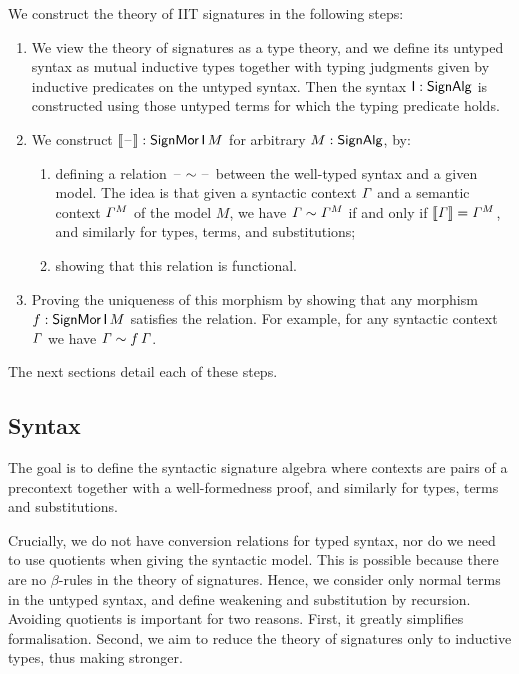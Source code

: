 


We construct the theory of IIT signatures in the following steps:
\begin{enumerate}
\item We view the theory of signatures as a type theory, and we define
  its untyped syntax as mutual inductive types together with typing
  judgments given by inductive predicates on the untyped syntax. Then
  the syntax $\mathsf{I} : \mathsf{SignAlg}$ is constructed using those untyped terms
  for which the typing predicate holds.
\item We construct $\llbracket\mathord{\hspace{1pt}\text{--}\hspace{1pt}}\rrbracket:\mathsf{SignMor}\,\mathsf{I}\,M$ for arbitrary
  $M : \mathsf{SignAlg}$, by:
  \begin{enumerate}
  \item defining a relation $\mathord{\hspace{1pt}\text{--}\hspace{1pt}} \sim \mathord{\hspace{1pt}\text{--}\hspace{1pt}}$ between the well-typed syntax
    and a given model. The idea is that given a syntactic context $\mathit{\Gamma}$ and a
    semantic context ${\mathit{\Gamma}}^M$ of the model $M$, we have
    $\mathit{\Gamma} \sim {\mathit{\Gamma}}^M$ if and only if $\llbracket\mathit{\Gamma}\rrbracket
    = {\mathit{\Gamma}}^M$, and similarly for types, terms, and substitutions;
  \item showing that this relation is functional.
    \end{enumerate}
  \item Proving the uniqueness of this morphism by showing that any morphism
    $f:\mathsf{SignMor}\,\mathsf{I}\,M$ satisfies the relation. For example, for any syntactic context
    $\mathit{\Gamma}$ we have $\mathit{\Gamma}\sim f\,\mathit{\Gamma}$.
\end{enumerate}
The next sections detail each of these steps.

\subsection{Syntax}

The goal is to define the syntactic signature algebra where contexts
are pairs of a precontext together with a well-formedness proof, and
similarly for types, terms and substitutions.

Crucially, we do not have conversion relations for typed syntax, nor
do we need to use quotients when giving the syntactic model. This is
possible because there are no $\beta$-rules in the theory of
signatures. Hence, we consider only normal terms in the untyped
syntax, and define weakening and substitution by recursion.  Avoiding
quotients is important for two reasons. First, it greatly simplifies
formalisation. Second, we aim to reduce the theory of signatures only
to inductive types, thus making  stronger.

